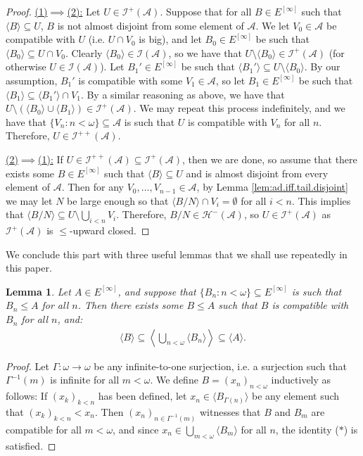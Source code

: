 \documentclass[11pt,reqno]{amsart}
\theoremstyle{plain}
\numberwithin{equation}{section}
\newtheorem{lemma}[theorem]{Lemma}
\theoremstyle{definition}
\renewcommand{\c}[1]{\langle #1 \rangle}
\newcommand{\bigc}[1]{\left\langle #1 \right\rangle}
\newcommand{\cal}{\mathcal}
\newcommand{\A}{\cal{A}}
\renewcommand{\H}{\cal{H}}
\newcommand{\I}{\cal{I}}
\begin{document}
\begin{proof}    
    \underline{(1)$\implies$(2):} Let $U \in \I^+(\A)$. Suppose that for all $B \in E^{[\infty]}$ such that $\c{B} \subseteq U$, $B$ is not almost disjoint from some element of $\A$. We let $V_0 \in \A$ be compatible with $U$ (i.e. $U \cap V_0$ is big), and let $B_0 \in E^{[\infty]}$ be such that $\c{B_0} \subseteq U \cap V_0$. Clearly $\c{B_0} \in \I(\A)$, so we have that $U \setminus \c{B_0} \in \I^+(\A)$ (for otherwise $U \in \I(\A)$). Let $B_1' \in E^{[\infty]}$ be such that $\c{B_1'} \subseteq U \setminus \c{B_0}$. By our assumption, $B_1'$ is compatible with some $V_1 \in \A$, so let $B_1 \in E^{[\infty]}$ be such that $\c{B_1} \subseteq \c{B_1'} \cap V_1$. By a similar reasoning as above, we have that $U \setminus (\c{B_0} \cup \c{B_1}) \in \I^+(\A)$. We may repeat this process indefinitely, and we have that $\{V_n : n < \omega\} \subseteq \A$ is such that $U$ is compatible with $V_n$ for all $n$. Therefore, $U \in \I^{++}(\A)$.

    \underline{(2)$\implies$(1):} If $U \in \I^{++}(\A) \subseteq \I^+(\A)$, then we are done, so assume that there exists some $B \in E^{[\infty]}$ such that $\c{B} \subseteq U$ and is almost disjoint from every element of $\A$. Then for any $V_0,\dots,V_{n-1} \in \A$, by Lemma \ref{lem:ad.iff.tail.disjoint} we may let $N$ be large enough so that $\c{B/N} \cap V_i = \emptyset$ for all $i < n$. This implies that $\c{B/N} \subseteq U \setminus \bigcup_{i<n} V_i$. Therefore, $B/N \in \H^-(\A)$, so $U \in \I^+(\A)$ as $\I^+(\A)$ is $\leq$-upward closed.
\end{proof}

We conclude this part with three useful lemmas that we shall use repeatedly in this paper.

\begin{lemma}
\label{lem:infinite.compatibility.lemma.1}
    Let $A \in E^{[\infty]}$, and suppose that $\{B_n : n < \omega\} \subseteq E^{[\infty]}$ is such that $B_n \leq A$ for all $n$. Then there exists some $B \leq A$ such that $B$ is compatible with $B_n$ for all $n$, and:
    \begin{align*}
        \c{B} \subseteq \bigc{\bigcup_{n<\omega} \c{B_n}} \subseteq \c{A}. \tag{$*$}
    \end{align*}
\end{lemma}

\begin{proof}
    Let $\Gamma : \omega \to \omega$ be any infinite-to-one surjection, i.e. a surjection such that $\Gamma^{-1}(m)$ is infinite for all $m < \omega$. We define $B = (x_n)_{n<\omega}$ inductively as follows: If $(x_k)_{k<n}$ has been defined, let $x_n \in \c{B_{\Gamma(n)}}$ be any element such that $(x_k)_{k<n} < x_n$. Then $(x_n)_{n\in\Gamma^{-1}(m)}$ witnesses that $B$ and $B_m$ are compatible for all $m < \omega$, and since $x_n \in \bigcup_{m<\omega} \c{B_m}$ for all $n$, the identity ($*$) is satisfied. 
\end{proof}
\end{document}
